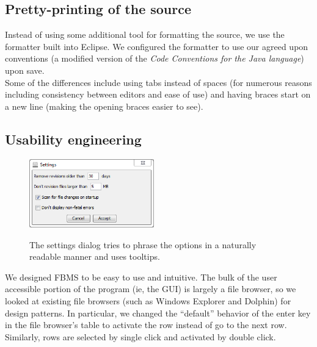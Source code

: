 \documentclass[12pt,a4paper]{article}
\begin{document}
\subsection{Pretty-printing of the source}
Instead of using some additional tool for formatting the source, we use the formatter built into Eclipse\cite{eclipse}. We configured the formatter to use our agreed upon conventions (a modified version of the \textit{Code Conventions for the Java language}\cite{conventions}) upon save. \\

Some of the differences include using tabs instead of spaces (for numerous reasons including consistency between editors and ease of use) and having braces start on a new line (making the opening braces easier to see).

\subsection{Usability engineering}
\begin{figure}
\vspace{-20pt}
\begin{center}
\includegraphics[width=0.48\textwidth]{images/settings.png}
\vspace{-15pt}
\end{center}
\footnotesize{The settings dialog tries to phrase the options in a naturally readable manner and uses tooltips.}
\end{figure}

We designed FBMS to be easy to use and intuitive. The bulk of the user accessible portion of the program (ie, the GUI) is largely a file browser, so we looked at existing file browsers (such as Windows Explorer\cite{explorer} and Dolphin\cite{dolphin}) for design patterns. In particular, we changed the ``default'' behavior of the enter key in the file browser's table to activate the row instead of go to the next row. Similarly, rows are selected by single click and activated by double click. \\
\end{document}

